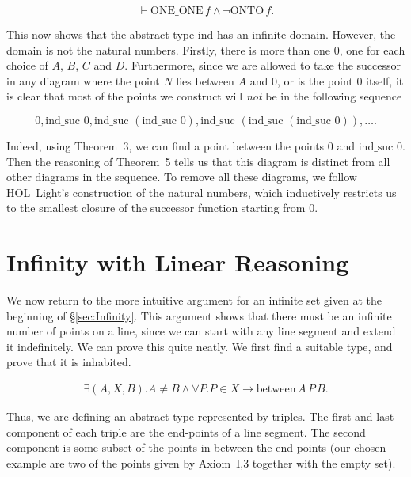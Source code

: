 \documentclass{article}
\newcommand{\between}[3]{\text{between}\,#1\,#2\,#3}
\begin{document}
\begin{displaymath}
\vdash \text{ONE\_ONE}\,f \wedge \neg\text{ONTO}\,f.
\end{displaymath}

This now shows that the abstract type $\text{ind}$ has an infinite domain. However, the domain is not the natural numbers. Firstly, there is more than one $0$, one for each choice of $A$, $B$, $C$ and $D$. Furthermore, since we are allowed to take the successor in any diagram where the point $N$ lies between $A$ and $0$, or is the point $0$ itself, it is clear that most of the points we construct will \emph{not} be in the following sequence

\begin{displaymath}
0, \text{ind\_suc } 0, \text{ind\_suc }(\text{ind\_suc } 0), \text{ind\_suc }(\text{ind\_suc }(\text{ind\_suc } 0)),  \ldots.
\end{displaymath}

Indeed, using Theorem~3, we can find a point between the points $0$ and $\text{ind\_suc } 0$. Then the reasoning of Theorem~5 tells us that this diagram is distinct from all other diagrams in the sequence. To remove all these diagrams, we follow HOL~Light's construction of the natural numbers, which inductively restricts us to the smallest closure of the successor function starting from $0$.

\section{Infinity with Linear Reasoning}
We now return to the more intuitive argument for an infinite set given at the beginning of \S\ref{sec:Infinity}. This argument shows that there must be an infinite number of points on a line, since we can start with any line segment and extend it indefinitely. We can prove this quite neatly. We first find a suitable type, and prove that it is inhabited.

\begin{align*}
\exists (A,X,B). A \neq B \wedge \forall P. P \in X \rightarrow \between{A}{P}{B}.
\end{align*}

Thus, we are defining an abstract type represented by triples. The first and last component of each triple are the end-points of a line segment. The second component is some subset of the points in between the end-points (our chosen example are two of the points given by Axiom~I,3 together with the empty set).
\end{document}
